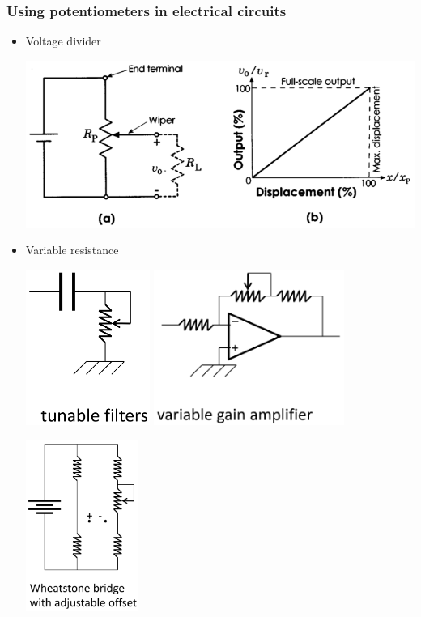 \documentclass[11pt]{article}
\begin{document}
\subsubsection{Using potentiometers in electrical circuits}
\label{sec:org77f2ed9}
\begin{itemize}
\item Voltage divider
\begin{center}
\includegraphics[width=.9\linewidth]{./images/voltage-divider-circuit-and-graph.png}
\end{center}
\item Variable resistance
\begin{center}
\includegraphics[width=0.32\textwidth]{./images/tunable-filter-diagram.png}
\includegraphics[width=0.49\textwidth]{./images/variable-gain-amplifier-diagram.png}
\end{center}

\begin{center}
\includegraphics[height=15em]{./images/wheatstone-bridge-with-adjustable-offset-diagram.png}
\end{center}
\end{itemize}
\end{document}
